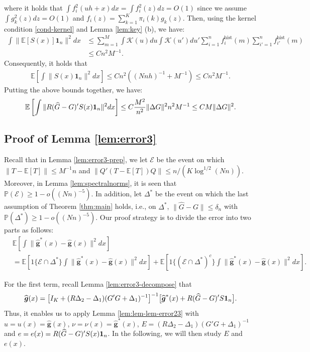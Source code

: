 \documentclass[preprint,11pt]{article}
\newcommand{\mbb}{\mathbb}
\newcommand{\mbf}{\mathbf}
\newcommand{\mcal}{\mathcal}
\newcommand{\bg}{{\boldsymbol g}}
\numberwithin{equation}{section}
\begin{document}
where it holds that $\int f_i^2(uh+x)dx=\int f_i^2(z)dz=O(1)$ since we assume $\int g_k^2(z)dz=O(1)$ and $f_i(z)=\sum_{k=1}^K \pi_i(k)g_k(z)$. Then, using the kernel condition \eqref{cond-kernel} and Lemma \ref{lem:key} (b), we have:
\begin{align*}
    \int \|\mbb{E}[S(x)]\mbf{1}_n\|^2dx
    &\le \sum_{m=1}^M\int \mcal{K}(u)du\int \mcal{K}(u')du'\sum_{i=1}^n f_i^{\text{hist}}(m)\sum_{i'=1}^n f_{i'}^{\text{hist}}(m)\\
    &\le Cn^2M^{-1}.
\end{align*}
Consequently, it holds that
\begin{align*}
    \mbb{E}\left[\int \|S(x)\mbf{1}_n\|^2dx\right]\le Cn^2\left((Nnh)^{-1}+M^{-1}\right)\le Cn^2M^{-1}.
\end{align*}
Putting the above bounds together, we have:
\begin{align*}
    \mbb{E}\left[\int \|R(\widehat{G}-G)'S(x){\bf 1}_n\|^2dx\right]\le C\frac{M^2}{n^2}\|\Delta G\|^2n^2M^{-1}\le CM\|\Delta G\|^2.
\end{align*}

\subsection{Proof of Lemma \ref{lem:error3}}
Recall that in Lemma \ref{lem:error3-prep}, we let $\mcal{E}$ be the event on which $\|T-\mbb{E}[T]\|\leq M^{-1}n$ and $\|Q'(T-\mbb{E}[T])Q\|\leq n/(K\log^{1/2}(Nn))$. Moreover, in Lemma \ref{lem:spectralnorms}, it is seen that $\mbb{P}(\mcal{E})\ge 1-o((Nn)^{-5})$. In addition, let $\Delta^*$ be the event on which the last assumption of Theorem \ref{thm:main} holds, i.e., on $\Delta^*$, $\|\widehat{G}-G\|\le \delta_n$ with $\mbb{P}(\Delta^*)\ge 1-o((Nn)^{-5})$. Our proof strategy is to divide the error into two parts as follows:
\begin{align*}
    &\mbb{E}\left[\int \|\bm{\widehat{g}}^*(x)-\widehat{\bm{g}}(x)\|^2dx\right]\\
    &=\mbb{E}\left[1\{\mcal{E}\cap \Delta^*\}\int \|\bm{\widehat{g}}^*(x)-\widehat{\bm{g}}(x)\|^2dx\right]+\mbb{E}\left[1\{(\mcal{E}\cap\Delta^*)^c\}\int \|\bm{\widehat{g}}^*(x)-\widehat{\bm{g}}(x)\|^2dx\right].
\end{align*}

For the first term, recall Lemma \ref{lem:error3-decompose} that
\[
\widehat{\boldsymbol g}(x) = \bigl[ I_K + (R\Delta_2-\Delta_1)(G'G+\Delta_1)^{-1}\bigr]^{-1}\bigl[ \widehat{\bg}^*(x) + R(\widehat{G}-G)'S{\bf 1}_n\bigr]. 
\]
Thus, it enables us to apply Lemma \ref{lem:lem-lem-error23} with $u=u(x)=\widehat{\boldsymbol g}(x)$, $\nu=\nu(x)=\widehat{\bg}^*(x)$, $E=(R\Delta_2-\Delta_1)(G'G+\Delta_1)^{-1}$ and $e=e(x)=R(\widehat{G}-G)'S(x){\bf 1}_n$. In the following, we will then study $E$ and $e(x)$.
\end{document}
